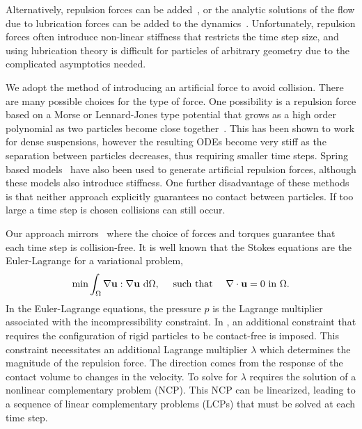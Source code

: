 \documentclass[preprint, 10pt]{elsarticle}
\begin{document}

 Alternatively, repulsion forces can be added~\cite{Malhotra2018}, or
the analytic solutions of the flow due to lubrication forces can be
added to the dynamics~\cite{Mammoli2006}.  Unfortunately, repulsion
forces often introduce non-linear stiffness that restricts the time step
size, and using lubrication theory is difficult for particles of arbitrary
geometry due to the complicated asymptotics needed.

We adopt the method of introducing an artificial force to avoid
collision. There are many possible choices for the type of force. One
possibility is a repulsion force based on a Morse or Lennard-Jones type
potential that grows as a high order polynomial as two particles become
close together~\cite{Flormann2017, Liu2006}. This has been shown to work
for dense suspensions, however the resulting ODEs become very stiff as
the separation between particles decreases, thus requiring smaller time
steps. Spring based models~\cite{Tsubota2006, Zhao2013, Kabacogulu2017}
have also been used to generate artificial repulsion forces, although
these models also introduce stiffness. One further disadvantage of these
methods is that neither approach explicitly guarantees no contact
between particles. If too large a time step is chosen collisions can
still occur. 


Our approach mirrors~\cite{Lu2017} where the choice of forces and
torques guarantee that each time step is collision-free.
It is well known that the Stokes equations are the Euler-Lagrange
for a variational problem,
\begin{align*}
  \min \int_{\Omega} \nabla{\mathbf{u}}:\nabla{\mathbf{u}}~\text{d}\Omega,
  \quad\text{ such that }\quad \nabla\cdot{\mathbf{u}} = 0 \text{ in }\Omega.
\end{align*} 
In the Euler-Lagrange equations, the pressure $p$ is the Lagrange
multiplier associated with the incompressibility constraint. In \cite{Lu2017}, an
additional constraint that requires the configuration of rigid particles
to be contact-free is imposed. This constraint necessitates an
additional Lagrange multiplier $\lambda$ which determines the magnitude
of the repulsion force. The direction comes from the response of the
contact volume to changes in the velocity. To solve for $\lambda$
requires the solution of a nonlinear complementary problem (NCP). This
NCP can be linearized, leading to a sequence of linear complementary
problems (LCPs) that must be solved at each time step.
\end{document}
